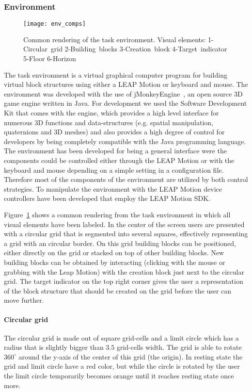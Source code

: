 \subsubsection{Environment}

\begin{figure}[H]
\centering
\texttt{[image: env\_comps]}
\caption{\label{fig:environmentcomps} Common rendering of the task environment. Visual elements: 1-Circular~grid 2-Building~blocks 3-Creation~block 4-Target~indicator 5-Floor 6-Horizon}
\end{figure}

\noindent The task environment is a virtual graphical computer program for building virtual block structures using either a LEAP Motion or keyboard and mouse. The environment was developed with the use of jMonkeyEngine~\cite{Irene:2012}, an open source 3D game engine written in Java. For development we used the Software Development Kit that comes with the engine, which provides a high level interface for numerous 3D functions and data-structures (e.g. spatial manipulation, quaternions and 3D meshes) and also provides a high degree of control for developers by being completely compatible with the Java programming language. The environment has been developed for being a general interface were the components could be controlled either through the LEAP Motion or with the keyboard and mouse depending on a simple setting in a configuration file. Therefore most of the components of the environment are utilized by both control strategies. To manipulate the environment with the LEAP Motion device controllers have been developed that employ the LEAP Motion SDK.

Figure~\ref{fig:environmentcomps} shows a common rendering from the task environment in which all visual elements have been labeled. In the center of the screen users are presented with a circular grid that is segmented into several squares, effectively representing a grid with an circular border. On this grid building blocks can be positioned, either directly on the grid or stacked on top of other building blocks. New building blocks can be obtained by interacting (clicking with the mouse or grabbing with the Leap Motion) with the creation block just next to the circular grid. The target indicator on the top right corner gives the user a representation of the block structure that should be created on the grid before the user can move further.

\paragraph{Circular grid}
The circular grid is made out of square grid-cells and a limit circle which has a radius that is slightly bigger than $3.5$ grid-cells width. The grid is able to rotate $360^{\circ}$ around the y-axis of the center of this grid (the origin). In resting state the grid and limit circle have a red color, but while the circle is rotated by the user the limit circle temporarily becomes orange until it reaches resting state once more. 

